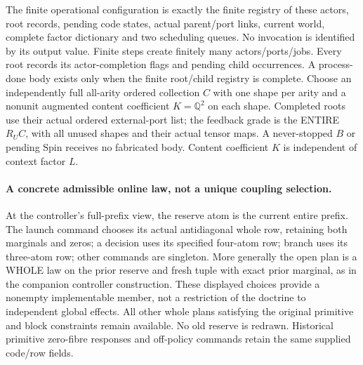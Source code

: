 \documentclass[11pt]{article}\usepackage{amsmath,amssymb,amsthm}
\begin{document}
The finite operational configuration is exactly the finite registry of these actors, root records, pending code states, actual parent/port links, current world, complete factor dictionary and two scheduling queues. No invocation is identified by its output value. Finite steps create finitely many actors/ports/jobs. Every root records its actor-completion flags and pending child occurrences. A process-done body exists only when the finite root/child registry is complete. Choose an independently full all-arity ordered collection $C$ with one shape per arity and a nonunit augmented content coefficient $K=\mathbb Q^2$ on each shape. Completed roots use their actual ordered external-port list; the feedback grade is the ENTIRE $R_UC$, with all unused shapes and their actual tensor maps. A never-stopped $B$ or pending Spin receives no fabricated body. Content coefficient $K$ is independent of context factor $L$.

\paragraph{A concrete admissible online law, not a unique coupling selection.}
At the controller's full-prefix view, the reserve atom is the current entire prefix. The launch command chooses its actual antidiagonal whole row, retaining both marginals and zeros; a decision uses its specified four-atom row; branch uses its three-atom row; other commands are singleton. More generally the open plan is a WHOLE law on the prior reserve and fresh tuple with exact prior marginal, as in the companion controller construction. These displayed choices provide a nonempty implementable member, not a restriction of the doctrine to independent global effects. All other whole plans satisfying the original primitive and block constraints remain available. No old reserve is redrawn. Historical primitive zero-fibre responses and off-policy commands retain the same supplied code/row fields.
\end{document}
